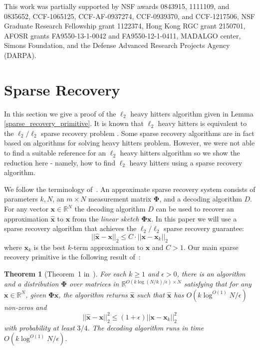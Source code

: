 \documentclass[11pt]{article}
\newcommand{\wh}{\widehat}
\newcommand{\bs}[1]{\boldsymbol{#1}}
\newcommand{\bv}[1]{\mathbf{#1}}
\newcommand{\R}{\mathbb{R}}
\newtheorem{theorem}{Theorem}
\begin{document}
This work was partially supported by NSF awards 0843915, 1111109, and 0835652, CCF-1065125, CCF-AF-0937274,  CCF-0939370,  and CCF-1217506, NSF Graduate Research Fellowship grant 1122374, Hong Kong RGC grant 2150701, AFOSR grants FA9550-13-1-0042 and FA9550-12-1-0411, MADALGO center, Simons Foundation, and the Defense Advanced Research Projects Agency (DARPA).

{}


\appendix


\section{Sparse Recovery}\label{sparse_recovery_appendix}
In this section we give a proof of the $\ell_2$ heavy hitters algorithm given in Lemma \ref{sparse_recovery_primitive}. It is known that $\ell_2$ heavy hitters is equivalent to the $\ell_2/\ell_2$ sparse recovery problem \cite{gilbert2010sparse}. Some sparse recovery algorithms are in fact based on algorithms for solving heavy hitters problem. However, we were not able to find a suitable reference for an $\ell_2$ heavy hitters algorithm so we show the reduction here - namely, how to find $\ell_2$ heavy hitters using a sparse recovery algorithm. 

We follow the terminology of~\cite{gilbert-stoc2010}. An approximate sparse recovery system consists of parameters $k, N$, an $m \times N$ measurement matrix $\bs{\Phi}$, and a decoding algorithm $D$. For any vector $\bv{x}\in \R^N$ the decoding algorithm $D$ can be used to recover an approximation $\wh{\bv{x}}$ to $\bv{x}$ from the {\em linear sketch} $\bv{\Phi}\bv{x}$. In this paper  we will use a sparse recovery algorithm that achieves the $\ell_2/\ell_2$ sparse recovery guarantee:
$$
||\wh{\bv{x}}-\bv{x}||_2\leq C\cdot ||\bv{x}-\bv{x}_k||_2
$$where $\bv{x}_k$ is the best $k$-term approximation to $\bv{x}$ and $C>1$.  Our main sparse recovery primitive is the following result of~\cite{gilbert-stoc2010}:
\begin{theorem}[Theorem~1 in~\cite{gilbert-stoc2010}]\label{thm:l2l2}
For each $k\geq 1$ and $\epsilon>0$, there is an algorithm and a distribution $\bs{\Phi}$ over matrices in $\R^{O(k\log (N/k) /\epsilon) \times N}$ satisfying that for any $\bv{x}\in \R^N$, given $\bs{\Phi}\bv{x}$, the algorithm returns $\wh{\bv{x}}$ such that $\wh{\bv{x}}$ has $O(k\log^{O(1)} N/\epsilon)$ non-zeros and 
$$
||\wh{\bv{x}}-\bv{x}||_2^2\leq (1+\epsilon) ||\bv{x}-\bv{x}_k||_2^2
$$
with probability at least $3/4$.
The decoding algorithm runs in time $O(k\log^{O(1)} N/\epsilon)$.
\end{theorem}
\end{document}
